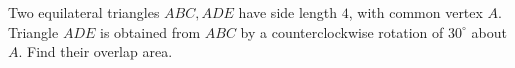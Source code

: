 Two equilateral triangles $ ABC,ADE $ have side length $ 4 $, with common vertex $ A $. Triangle $ ADE $ is obtained from $ ABC $ by a counterclockwise rotation of $ 30^\circ $ about $ A $. Find their overlap area.
